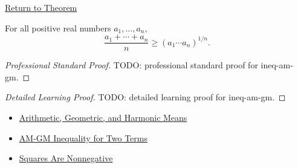 \newpage
{}
\label{prf:ineq-am-gm}

\begin{remark*}[Return]
\hyperref[thm:ineq-am-gm]{Return to Theorem}
\end{remark*}

\begin{theorem*}[AM-GM Inequality]
For all positive real numbers $a_1,\dots,a_n$,
\[
\frac{a_1+\cdots+a_n}{n}
\ge
(a_1\cdots a_n)^{1/n}.
\]
\end{theorem*}

\begin{proof}[Professional Standard Proof]
\LRAProofBodyStart
TODO: professional standard proof for ineq-am-gm.
\end{proof}

\begin{proof}[Detailed Learning Proof]
\LRAProofBodyStart
TODO: detailed learning proof for ineq-am-gm.
\end{proof}

\begin{remark*}
\end{remark*}

\begin{dependencies}
\begin{itemize}
  \item \hyperref[def:classical-means]{Arithmetic, Geometric, and Harmonic Means}
  \item \hyperref[thm:ineq-am-gm-two]{AM-GM Inequality for Two Terms}
  \item \hyperref[thm:square-nonnegative]{Squares Are Nonnegative}
\end{itemize}
\end{dependencies}

\clearpage

